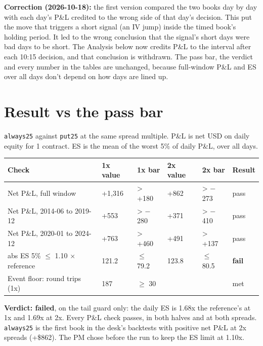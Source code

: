 \documentclass{article}
\begin{document}
\textbf{Correction (2026-10-18):} the first version compared the two books day by day with each day's P\&L credited to the wrong side of that day's decision. This put the move that triggers a short signal (an IV jump) inside the timed book's holding period. It led to the wrong conclusion that the signal's short days were bad days to be short. The Analysis below now credits P\&L to the interval after each 10:15 decision, and that conclusion is withdrawn. The pass bar, the verdict and every number in the tables are unchanged, because full-window P\&L and ES over all days don't depend on how days are lined up.

\section{Result vs the pass bar}

\texttt{always25} against \texttt{put25} at the same spread multiple. P\&L is net USD on daily equity for 1 contract. ES is the mean of the worst 5\% of daily P\&L, over all days.

\begin{center}\small
\begin{tabularx}{\linewidth}{>{\raggedright\arraybackslash}X l l l l l}
\toprule
\textbf{Check} & \textbf{1x value} & \textbf{1x bar} & \textbf{2x value} & \textbf{2x bar} & \textbf{Result} \\
\midrule
Net P\&L, full window & +1,316 & > +180 & +862 & > \ensuremath{-}273 & pass \\
Net P\&L, 2014-06 to 2019-12 & +553 & > \ensuremath{-}280 & +371 & > \ensuremath{-}410 & pass \\
Net P\&L, 2020-01 to 2024-12 & +763 & > +460 & +491 & > +137 & pass \\
abs ES 5\% \ensuremath{\leq} 1.10 \ensuremath{\times} reference & 121.2 & \ensuremath{\leq} 79.2 & 123.8 & \ensuremath{\leq} 80.5 & \textbf{fail} \\
Event floor: round trips (1x) & 187 & \ensuremath{\geq} 30 &  &  & met \\
\bottomrule
\end{tabularx}
\end{center}

\textbf{Verdict: failed}, on the tail guard only: the daily ES is 1.68x the reference's at 1x and 1.69x at 2x. Every P\&L check passes, in both halves and at both spreads. \texttt{always25} is the first book in the desk's backtests with positive net P\&L at 2x spreads (+\$862). The PM chose before the run to keep the ES limit at 1.10x.
\end{document}
